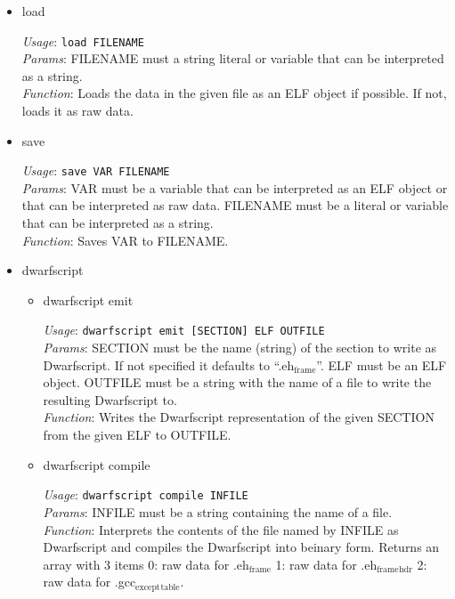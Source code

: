 \documentclass[11pt]{article}
\begin{document}
\begin{itemize}

\item load\\
\label{sec-2.1.2.1}

     \emph{Usage}: \texttt{load FILENAME}\\
     \emph{Params}: FILENAME must a string literal or variable that can be interpreted
               as a string.\\
     \emph{Function}: Loads the data in the given file as an ELF object if
               possible. If not, loads it as raw data.

\item save\\
\label{sec-2.1.2.2}

     \emph{Usage}: \texttt{save VAR FILENAME}\\
     \emph{Params}: VAR must be a variable that can be interpreted as an ELF
               object or that can be interpreted as raw data. FILENAME must be a
               literal or variable that can be interpreted as a string.\\
     \emph{Function}: Saves VAR to FILENAME.

\item dwarfscript\\
\label{sec-2.1.2.3}

\begin{itemize}

\item dwarfscript emit\\
\label{sec-2.1.2.3.1}

      \emph{Usage}: \texttt{dwarfscript emit [SECTION] ELF OUTFILE}\\
      \emph{Params}: SECTION must be the name (string) of the section to write as
                Dwarfscript. If not specified it defaults to
                ``.eh$_{\mathrm{frame}}$''. ELF must be an ELF object. OUTFILE must
                be a string with the name of a file to write the resulting
                Dwarfscript to.\\
      \emph{Function}: Writes the Dwarfscript representation of the given
                  SECTION from the given ELF to OUTFILE.

\item dwarfscript compile\\
\label{sec-2.1.2.3.2}

      \emph{Usage}: \texttt{dwarfscript compile INFILE}\\
      \emph{Params}: INFILE must be a string containing the name of a file.\\
      \emph{Function}: Interprets the contents of the file named by INFILE
                  as Dwarfscript and compiles the Dwarfscript into
                  beinary form. Returns an array with 3 items
                  0: raw data for .eh$_{\mathrm{frame}}$ 
                  1: raw data for .eh$_{\mathrm{frame}}$$_{\mathrm{hdr}}$
                  2: raw data for .gcc$_{\mathrm{except}}$$_{\mathrm{table}}$.
\end{itemize} %


\end{itemize}
\end{document}
